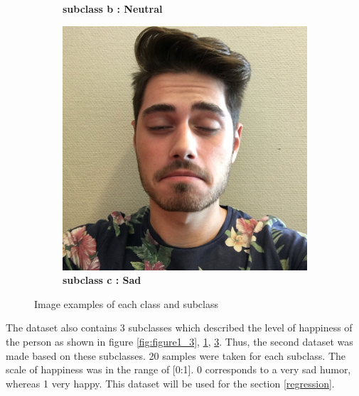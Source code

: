 \begin{figure}[!hp]
\begin{subfigure}[t]{0.18\textwidth}
	\captionsetup{font=small}
	\caption{\bf subclass b : Neutral}
    \label{fig:figure1_4}
    \end{subfigure}
    \begin{subfigure}[t]{0.18\textwidth}
    \centering
    \includegraphics[height=0.05\textheight]{dataset/IMG_1452.jpg}
	\captionsetup{font=small}
	\caption{\bf subclass c : Sad}
    \label{fig:figure1_5}
    \end{subfigure}
\caption{Image examples of each class and subclass}
\end{figure}
    The dataset also contains 3 subclasses which described the level of happiness of the person as shown in figure \ref{fig:figure1_3}, \ref{fig:figure1_4}, \ref{fig:figure1_5}. Thus, the second dataset was made based on these subclasses. 20 samples were taken for each subclass. The scale of happiness was in the range of [0:1]. 0 corresponds to a very sad humor, whereas 1 very happy. This dataset will be used for the section \ref{regression}.
    

